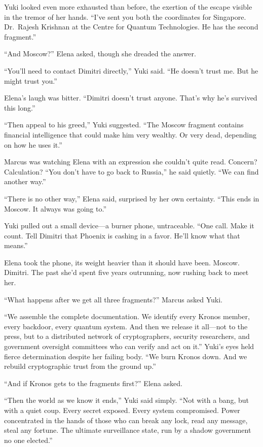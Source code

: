 Yuki looked even more exhausted than before, the exertion of the escape visible in the tremor of her hands. ``I've sent you both the coordinates for Singapore. Dr.~Rajesh Krishnan at the Centre for Quantum Technologies. He has the second fragment.''

``And Moscow?'' Elena asked, though she dreaded the answer.

``You'll need to contact Dimitri directly,'' Yuki said. ``He doesn't trust me. But he might trust you.''

Elena's laugh was bitter. ``Dimitri doesn't trust anyone. That's why he's survived this long.''

``Then appeal to his greed,'' Yuki suggested. ``The Moscow fragment contains financial intelligence that could make him very wealthy. Or very dead, depending on how he uses it.''

Marcus was watching Elena with an expression she couldn't quite read. Concern? Calculation? ``You don't have to go back to Russia,'' he said quietly. ``We can find another way.''

``There is no other way,'' Elena said, surprised by her own certainty. ``This ends in Moscow. It always was going to.''

Yuki pulled out a small device---a burner phone, untraceable. ``One call. Make it count. Tell Dimitri that Phoenix is cashing in a favor. He'll know what that means.''

Elena took the phone, its weight heavier than it should have been. Moscow. Dimitri. The past she'd spent five years outrunning, now rushing back to meet her.

``What happens after we get all three fragments?'' Marcus asked Yuki.

``We assemble the complete documentation. We identify every Kronos member, every backdoor, every quantum system. And then we release it all---not to the press, but to a distributed network of cryptographers, security researchers, and government oversight committees who can verify and act on it.'' Yuki's eyes held fierce determination despite her failing body. ``We burn Kronos down. And we rebuild cryptographic trust from the ground up.''

``And if Kronos gets to the fragments first?'' Elena asked.

``Then the world as we know it ends,'' Yuki said simply. ``Not with a bang, but with a quiet coup. Every secret exposed. Every system compromised. Power concentrated in the hands of those who can break any lock, read any message, steal any fortune. The ultimate surveillance state, run by a shadow government no one elected.''

